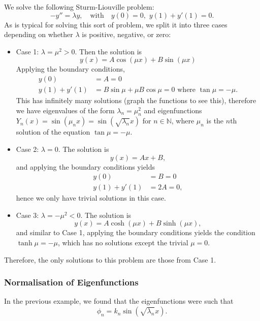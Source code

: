 \begin{eg}\label{eg:sl1}
	We solve the following Sturm-Liouville problem:
	\[
	-y'' = \lambda y, \quad\text{with}\quad y(0)=0,\,\, y(1) + y'(1) = 0.
	\]
	As is typical for solving this sort of problem, we split it into three cases depending on whether $\lambda$ is positive, negative, or zero:
	\begin{itemize}
		\item Case 1: $\lambda = \mu^2 > 0$. Then the solution is
		\[
		y(x) = A\cos(\mu x) + B\sin(\mu x)
		\]
		Applying the boundary conditions,
		\begin{align*}
			y(0) &= A = 0 \\
			y(1) + y'(1) &= B\sin\mu + \mu B\cos\mu = 0 \text{ where } \tan\mu = -\mu.
		\end{align*}
		This has infinitely many solutions (graph the functions to see this), therefore we have eigenvalues of the form $\lambda_n = \mu_n^2$ and eigenfunctions $Y_n(x) = \sin(\mu_n x) = \sin(\sqrt{\lambda_n}x)$ for $n \in \mathbb{N}$, where $\mu_n$ is the $n$th solution of the equation $\tan\mu = -\mu$.
		
		\item Case 2: $\lambda = 0$. The solution is
		\[
		y(x) = Ax + B,
		\]
		and applying the boundary conditions yields
		\begin{align*}
			y(0) &= B = 0 \\
			y(1) + y'(1) &= 2A = 0,
		\end{align*}
		hence we only have trivial solutions in this case.
		
		\item Case 3: $\lambda = -\mu^2 < 0$. The solution is
		\[
		y(x) = A\cosh(\mu x) + B\sinh(\mu x),
		\]
		and similar to Case 1, applying the boundary conditions yields the condition $\tanh\mu = -\mu$, which has no solutions except the trivial $\mu = 0$.
	\end{itemize}
	Therefore, the only solutions to this problem are those from Case 1.
\end{eg}

\subsubsection{Normalisation of Eigenfunctions}\label{sec:normaleigenfuncs}

In the previous example, we found that the eigenfunctions were such that
\[
\phi_n = k_n \sin(\sqrt{\lambda_n}x).
\]

